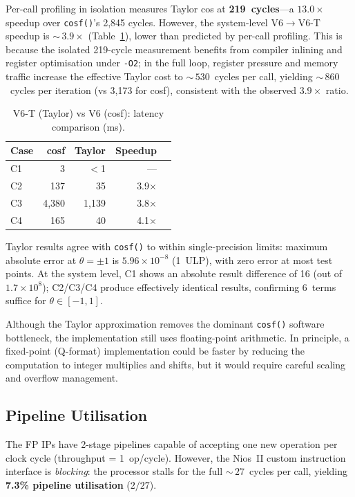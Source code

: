 \documentclass[a4paper,10pt,twocolumn]{article}
\begin{document}
Per-call profiling in isolation measures Taylor cos at \textbf{219~cycles}---a $\mathbf{13.0\times}$ speedup over \texttt{cosf()}'s 2{,}845 cycles.
However, the system-level V6$\to$V6-T speedup is ${\sim}\,3.9\times$ (Table~\ref{tab:taylor_vs_cosf}), lower than predicted by per-call profiling.
This is because the isolated 219-cycle measurement benefits from compiler inlining and register optimisation under \texttt{-O2}; in the full loop, register pressure and memory traffic increase the effective Taylor cost to ${\sim}\,530$~cycles per call, yielding ${\sim}\,860$~cycles per iteration (vs 3{,}173 for cosf), consistent with the observed $3.9\times$ ratio.

\begin{table}[H]
\centering
\caption{V6-T (Taylor) vs V6 (cosf): latency comparison (ms).}
\label{tab:taylor_vs_cosf}
\small
\begin{tabular}{lrrrr}
\toprule
Case & cosf & Taylor & Speedup \\
\midrule
C1 & 3    & $<$1   & --- \\
C2 & 137  & 35     & 3.9$\times$ \\
C3 & 4{,}380 & 1{,}139 & 3.8$\times$ \\
C4 & 165  & 40     & 4.1$\times$ \\
\bottomrule
\end{tabular}
\end{table}

Taylor results agree with \texttt{cosf()} to within single-precision limits: maximum absolute error at $\theta = \pm1$ is $5.96\!\times\!10^{-8}$ (1~ULP), with zero error at most test points.
At the system level, C1 shows an absolute result difference of 16 (out of $1.7\!\times\!10^8$); C2/C3/C4 produce effectively identical results, confirming 6~terms suffice for $\theta \in [-1,1]$.

Although the Taylor approximation removes the dominant \texttt{cosf()} software bottleneck, the implementation still uses floating-point arithmetic.
In principle, a fixed-point (Q-format) implementation could be faster by reducing the computation to integer multiplies and shifts, but it would require careful scaling and overflow management.

\subsection{Pipeline Utilisation}
\label{sec:pipeline}

The FP IPs have 2-stage pipelines capable of accepting one new operation per clock cycle (throughput = 1~op/cycle).
However, the Nios~II custom instruction interface is \emph{blocking}: the processor stalls for the full ${\sim}\,27$~cycles per call, yielding \textbf{7.3\% pipeline utilisation} ($2/27$).
\end{document}
